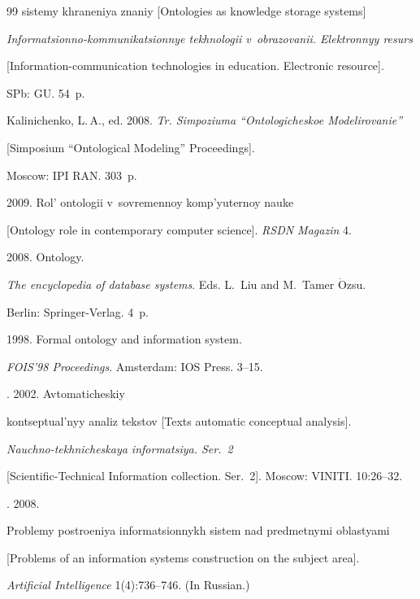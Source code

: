 {{\begin{thebibliography}{99}
sistemy khraneniya znaniy [Ontologies as knowledge storage systems] 


\textit{Informatsionno-kommunikatsionnye tekhnologii v~obrazovanii. Elektronnyy resurs}


[Information-communication technologies in education. Electronic resource]. 


SPb: GU. 54~p.







Kalinichenko, L.\,A., ed. 2008. \textit{Tr. Simpoziuma ``Ontologicheskoe Modelirovanie''} 


[Simposium ``Ontological Modeling'' Proceedings]. 


Moscow: IPI RAN. 303~p. 




 2009. Rol' ontologii v~sovremennoy komp'yuternoy nauke 


[Ontology role in contemporary computer science]. \textit{RSDN Magazin} 4. 




 2008. Ontology.  


\textit{The encyclopedia of database systems}. Eds. L.~Liu and M.~Tamer $\ddot{\mbox{O}}$zsu. 


Berlin: Springer-Verlag. 4~p.




 1998. Formal ontology and information system. 


\textit{FOIS'98 Proceedings}. Amsterdam: IOS Press. 3--15.




. 2002. Avtomaticheskiy 


kontseptual'nyy analiz tekstov [Texts automatic conceptual analysis].


\textit{Nauchno-tekhnicheskaya informatsiya. Ser.~2} 


[Scientific-Technical Information collection. Ser.~2]. Moscow: VINITI. 10:26--32.




. 2008. 


Problemy postroeniya informatsionnykh sistem nad predmetnymi oblastyami 


[Problems of an information systems construction on the subject area]. 


\textit{Artificial Intelligence} 1(4):736--746. (In Russian.)





\end{thebibliography}


} }








